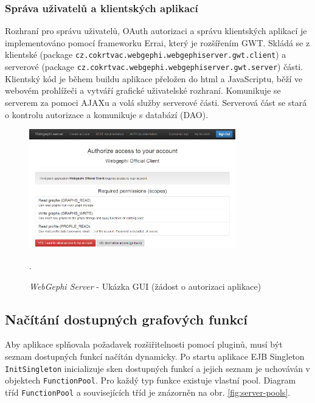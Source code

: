 \documentclass[thesis=M,czech]{FITthesis}[2014/05/6]
\begin{document}
\subsubsection{Správa uživatelů a klientských aplikací}
Rozhraní pro správu uživatelů, OAuth autorizaci a správu klientských aplikací je implementováno pomocí frameworku Errai, který je rozšířením GWT.
Skládá se z klientské (package \texttt{cz\-.cokrtvac\-.webgephi\-.webgephiserver\-.gwt\-.client}) a serverové (package \texttt{cz\-.cokrtvac\-.webgephi\-.webgephiserver\-.gwt\-.server}) části.
Klientský kód je během buildu aplikace přeložen do html a JavaScriptu, běží ve webovém prohlížeči a vytváří grafické uživatelské rozhraní. Komunikuje se serverem za pomoci AJAXu a volá 
služby serverové části. Serverová část se stará o kontrolu autorizace a komunikuje s databází (DAO).

\begin{figure}\centering
 	\includegraphics[width=0.8\textwidth]{images/prtsc/server-auth_request}
 	\caption[\textit{WebGephi Server} - Ukázka GUI (žádost o autorizaci aplikace)]{\textit{WebGephi Server} - Ukázka GUI (žádost o autorizaci aplikace)}.\label{fig:server-auth_request}
\end{figure}

\subsection{Načítání dostupných grafových funkcí}
Aby aplikace splňovala požadavek rozšiřitelnosti pomocí pluginů, musí být seznam dostupných funkcí načítán dynamicky. Po startu aplikace EJB Singleton 
\texttt{InitSingleton} inicializuje sken dostupných funkcí a jejich seznam je uchováván v objektech \texttt{FunctionPool}. Pro každý typ funkce existuje vlastní pool.
Diagram tříd \texttt{FunctionPool} a souvisejících tříd je znázorněn na obr. \ref{fig:server-pools}.
\end{document}
